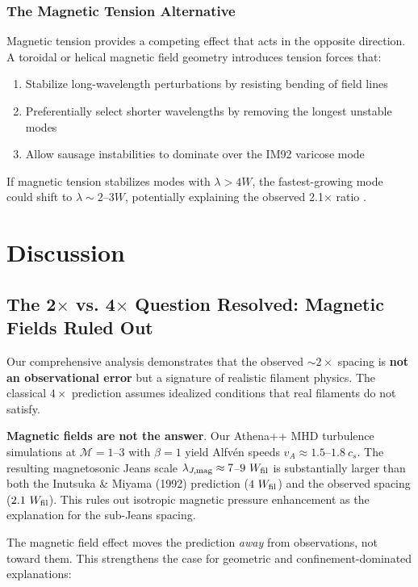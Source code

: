 \documentclass[11pt,a4paper]{article}
\begin{document}
\subsubsection{The Magnetic Tension Alternative}

Magnetic tension provides a competing effect that acts in the opposite direction. A toroidal or helical magnetic field geometry introduces tension forces that:
\begin{enumerate}
    \item Stabilize long-wavelength perturbations by resisting bending of field lines
    \item Preferentially select shorter wavelengths by removing the longest unstable modes
    \item Allow sausage instabilities to dominate over the IM92 varicose mode
\end{enumerate}

If magnetic tension stabilizes modes with $\lambda > 4W$, the fastest-growing mode could shift to $\lambda \sim 2$--$3W$, potentially explaining the observed 2.1$\times$ ratio \citep{Nagasawa1987, Fiege2000, Hanawa2017}.

\section{Discussion}

\subsection{The 2$\times$ vs. 4$\times$ Question Resolved: Magnetic Fields Ruled Out}

Our comprehensive analysis demonstrates that the observed $\sim2\times$ spacing is \textbf{not an observational error} but a signature of realistic filament physics. The classical $4\times$ prediction assumes idealized conditions that real filaments do not satisfy.

\textbf{Magnetic fields are not the answer}. Our Athena++ MHD turbulence simulations at $\mathcal{M} = 1$--3 with $\beta = 1$ yield Alfv\'en speeds $v_A \approx 1.5$--$1.8~c_s$. The resulting magnetosonic Jeans scale $\lambda_{J, {\rm mag}} \approx 7$--$9~W_{\rm fil}$ is substantially larger than both the Inutsuka \& Miyama (1992) prediction ($4~W_{\rm fil}$) and the observed spacing ($2.1~W_{\rm fil}$). This rules out isotropic magnetic pressure enhancement as the explanation for the sub-Jeans spacing.

The magnetic field effect moves the prediction \textit{away} from observations, not toward them. This strengthens the case for geometric and confinement-dominated explanations:
\end{document}

